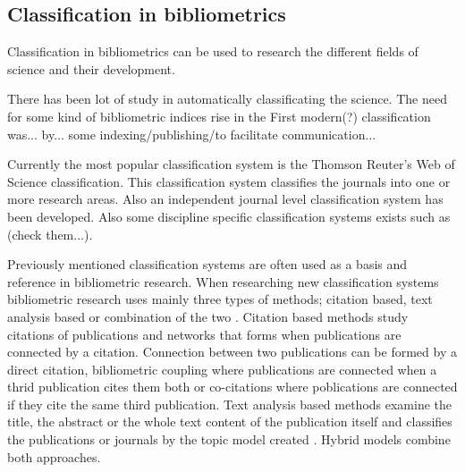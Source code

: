 \subsection{Classification in bibliometrics}
Classification in bibliometrics can be used to research the 
different fields of science and their development.

There has been lot of study in automatically classificating the 
science. 
The need for some kind of bibliometric indices rise in the 
First modern(?) classification was... by... some 
indexing/publishing/to facilitate communication...

Currently the most popular classification system is the Thomson 
Reuter's Web of Science classification. This classification 
system classifies the journals into one or more research areas. 
\cite{waltman_new_2012} 
Also an independent journal level classification system has been 
developed. \cite{archambault_towards_2011}
Also some discipline specific classification systems exists such 
as (check them...).

Previously mentioned classification systems are often used as a 
basis and reference in bibliometric research. When 
researching new classification systems bibliometric research 
uses mainly three types of methods; citation based, text analysis 
based or combination of the two \cite{janssens_hybrid_2009}.
Citation based methods study citations of publications and 
networks that forms when publications are connected by a 
citation. Connection between two publications can be 
formed by a direct citation, bibliometric coupling where 
publications are connected when a thrid publication cites them 
both or co-citations where poblications are connected if they 
cite the same third publication.
Text analysis based methods examine the title, the abstract or 
the whole text content of the publication itself and classifies 
the publications or journals by the topic model created 
\cite{blei}.
Hybrid models combine both approaches.

